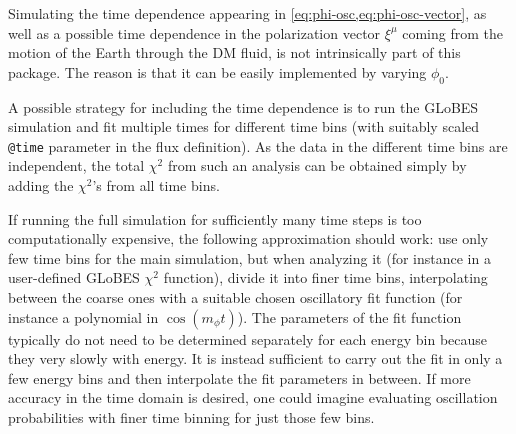 \documentclass{scrartcl}
\begin{document}
Simulating the time dependence appearing in \cref{eq:phi-osc,eq:phi-osc-vector},
as well as a possible time dependence in the polarization vector $\xi^\mu$
coming from the motion of the Earth through the DM fluid, is not intrinsically
part of this package.  The reason is that it can be easily implemented by
varying $\phi_0$.

A possible strategy for including the time dependence is to run the GLoBES
simulation and fit multiple times for different time bins (with suitably
scaled {\tt @time} parameter in the flux definition). As the data in
the different time bins are independent, the total $\chi^2$ from such an
analysis can be obtained simply by adding the $\chi^2$'s from all time bins.

If running the full simulation for sufficiently many time steps is too
computationally expensive, the following approximation should work: use
only few time bins for the main simulation, but when analyzing it (for
instance in a user-defined GLoBES $\chi^2$ function), divide it into
finer time bins, interpolating between the coarse ones with a suitable
chosen oscillatory fit function (for instance a polynomial in $\cos(m_\phi t)$).
The parameters of the fit function typically do not need to be determined
separately for each energy bin because they very slowly with energy.  It
is instead sufficient to carry out the fit in only a few energy bins
and then interpolate the fit parameters in between.  If more accuracy in
the time domain is desired, one could imagine evaluating oscillation
probabilities with finer time binning for just those few bins.




\end{document}
